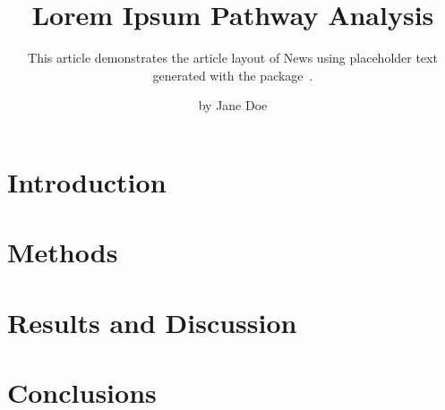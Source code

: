 
\title{Lorem Ipsum Pathway Analysis}
\subtitle{This article demonstrates the article layout of \WP News using
placeholder text generated with the  package~\cite{Lorem2026}.}
\author{by Jane Doe}

\maketitle

\section*{Introduction}
\lipsum[1-2]

\section*{Methods}
\lipsum[3]

\section*{Results and Discussion}
\lipsum[4]

\section*{Conclusions}
\lipsum[5]

\address{Jane Doe\\
}

\printbibliography
